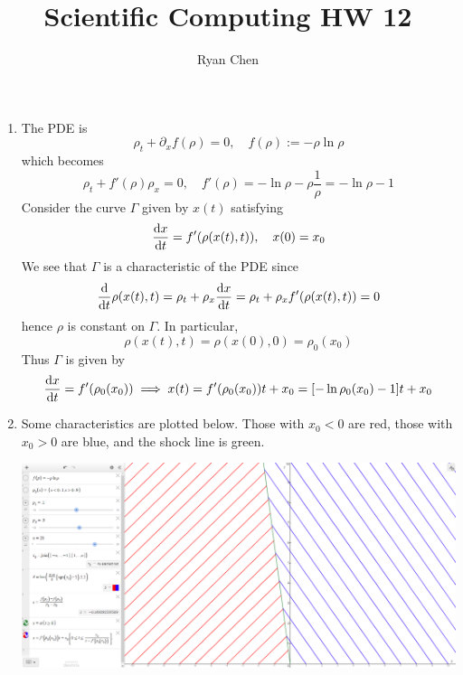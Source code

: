 \documentclass{article}
\title{Scientific Computing HW 12}
\author{Ryan Chen}
\newcommand{\imp}{\implies}
\newcommand{\ptl}{\partial}
\begin{document}
	
\maketitle

\begin{enumerate}[label=(\alph*)]
	
\item The PDE is
$$\rho_t + \ptl_x f(\rho) = 0,
\quad f(\rho) := -\rho\ln\rho$$
which becomes
$$\rho_t + f'(\rho)\rho_x = 0,
\quad f'(\rho) = -\ln\rho - \rho\frac1\rho = -\ln\rho - 1$$
Consider the curve $\Gamma$ given by $x(t)$ satisfying
$$\dv{x}{t} = f'(\rho(x(t),t)),
\quad x(0) = x_0$$
We see that $\Gamma$ is a characteristic of the PDE since
$$\dv{t}\rho(x(t),t) = \rho_t + \rho_x\dv{x}{t}
= \rho_t + \rho_xf'(\rho(x(t),t))
= 0$$
hence $\rho$ is constant on $\Gamma$. In particular,
$$\rho(x(t),t) = \rho(x(0),0) = \rho_0(x_0)$$
Thus $\Gamma$ is given by
$$\dv{x}{t} = f'(\rho_0(x_0))
\imp x(t) = f'(\rho_0(x_0))t + x_0
= [-\ln\rho_0(x_0)-1]t + x_0$$


\item Some characteristics are plotted below. Those with $x_0<0$ are red, those with $x_0>0$ are blue, and the shock line is green.

\begin{center}
	\includegraphics[scale=.3]{hw12 plot}
\end{center}



\end{enumerate}
\end{document}
